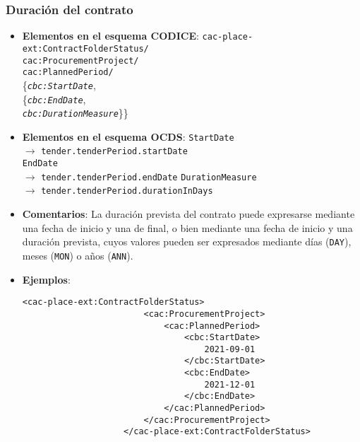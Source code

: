         \subsubsection{Duración del contrato}
        \begin{itemize}
            \item \textbf{Elementos en el esquema CODICE}:
                \tabto{7.7cm} \texttt{cac-place-ext:ContractFolderStatus/} \\
                \tabto{7.7cm} \texttt{cac:ProcurementProject/} \\
                \tabto{7.7cm} \texttt{cac:PlannedPeriod/} \\
                \tabto{7.7cm} \{\texttt{\textit{cbc:StartDate}}, \\
                \tabto{7.7cm} \{\texttt{\textit{cbc:EndDate}}, \\
                \tabto{7.7cm} \texttt{\textit{cbc:DurationMeasure}}\}\}
            \item \textbf{Elementos en el esquema OCDS}:
                \tabto{7.7cm} \texttt{StartDate} \\ \tabto{8cm} $\rightarrow$ \texttt{tender.tenderPeriod.startDate} \\
                \tabto{7.7cm} \texttt{EndDate} \\ \tabto{8cm} $\rightarrow$ \texttt{tender.tenderPeriod.endDate}
                \tabto{7.7cm} \texttt{DurationMeasure} \\ \tabto{8cm} $\rightarrow$ \texttt{tender.tenderPeriod.durationInDays}
            \item \textbf{Comentarios}: La duración prevista del contrato puede expresarse mediante una fecha de inicio y una de final, o bien mediante una fecha de inicio y una duración prevista, cuyos valores pueden ser expresados mediante días (\texttt{DAY}), meses (\texttt{MON}) o años (\texttt{ANN}).
            \item \textbf{Ejemplos}: \\
                \begin{lstlisting}[language=lXML]
                    <cac-place-ext:ContractFolderStatus>
                        <cac:ProcurementProject>
                            <cac:PlannedPeriod>
                                <cbc:StartDate>
                                    2021-09-01
                                </cbc:StartDate>
                                <cbc:EndDate>
                                    2021-12-01
                                </cbc:EndDate>
                            </cac:PlannedPeriod>
                        </cac:ProcurementProject>
                    </cac-place-ext:ContractFolderStatus>
                \end{lstlisting}
                

\end{itemize}
